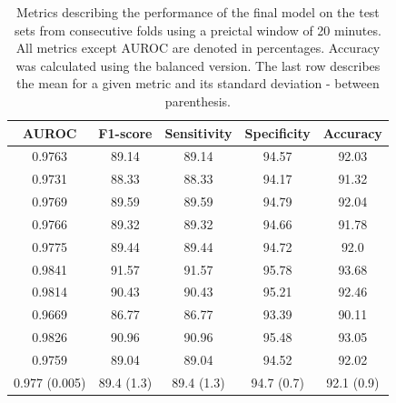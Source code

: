 \documentclass[a4paper,fleqn]{cas-sc}
\begin{document}
\begin{table}[h]
    \centering
    \begin{tabular}{c|c|c|c|c}    
        AUROC & F1-score & Sensitivity & Specificity & Accuracy \\
        \hline
        \hline
        0.9763 & 89.14 & 89.14 & 94.57 & 92.03 \\
        0.9731 & 88.33 & 88.33 & 94.17 & 91.32 \\
        0.9769 & 89.59 & 89.59 & 94.79 & 92.04 \\
        0.9766 & 89.32 & 89.32 & 94.66 & 91.78 \\
        0.9775 & 89.44 & 89.44 & 94.72 & 92.0 \\
        0.9841 & 91.57 & 91.57 & 95.78 & 93.68 \\
        0.9814 & 90.43 & 90.43 & 95.21 & 92.46 \\
        0.9669 & 86.77 & 86.77 & 93.39 & 90.11 \\
        0.9826 & 90.96 & 90.96 & 95.48 & 93.05 \\
        0.9759 & 89.04 & 89.04 & 94.52 & 92.02 \\
        \hline
        0.977 (0.005) & 89.4 (1.3) & 89.4 (1.3) & 94.7 (0.7) & 92.1 (0.9) \\
        \hline
    \end{tabular}
\caption{Metrics describing the performance of the final model on the test sets from consecutive folds using a preictal window of 20 minutes. All metrics except AUROC are denoted in percentages. Accuracy was calculated using the balanced version. The last row describes the mean for a given metric and its standard deviation - between parenthesis.}
\label{tab:numbers_1200}
\end{table}
\end{document}
